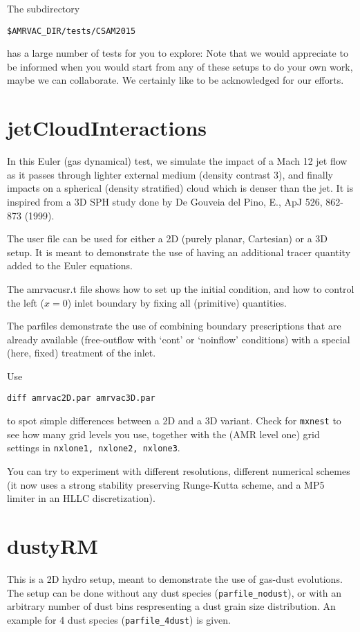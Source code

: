 \documentclass[10pt]{article}
\begin{document}
\newpage
The subdirectory 

{\tt \$AMRVAC\_DIR/tests/CSAM2015}

has a large number of tests for you to explore:
Note that we would appreciate to be informed when you would start from any of these setups to do your own work, maybe we can collaborate. We certainly like to be acknowledged for our efforts.

\section*{jetCloudInteractions}
In this Euler (gas dynamical) test, we simulate the impact of a Mach 12 jet flow as it passes through lighter external medium (density contrast 3), and finally impacts on a spherical (density stratified) cloud which is denser than the jet. It is inspired from a 3D SPH study done by De Gouveia del Pino, E., ApJ 526, 862-873 (1999).

The user file can be used for either a 2D (purely planar, Cartesian) or a 3D setup. It is meant to demonstrate the use of having an additional tracer quantity added to the Euler equations.

The amrvacusr.t file shows how to set up the initial condition, and how to control the left ($x=0$) inlet boundary by fixing all (primitive) quantities.

The parfiles demonstrate the use of combining boundary prescriptions that are already available (free-outflow with `cont' or `noinflow' conditions) with a special (here, fixed) treatment of the inlet.

Use 
\begin{verbatim}
diff amrvac2D.par amrvac3D.par
\end{verbatim}
to spot simple differences between a 2D and a 3D variant. Check for {\tt mxnest} to see how many grid levels you use, together with the (AMR level one) grid settings in {\tt nxlone1, nxlone2, nxlone3}.

You can try to experiment with different resolutions, different numerical schemes (it now uses a strong stability preserving Runge-Kutta scheme, and a MP5 limiter in an HLLC discretization).


\section*{dustyRM}

This is a 2D hydro setup, meant to demonstrate the use of gas-dust evolutions. The setup can be done without any dust species ({\tt parfile\_nodust}), or with an arbitrary number of dust bins respresenting a dust grain size distribution. An example for 4 dust species ({\tt parfile\_4dust}) is given.
\end{document}
